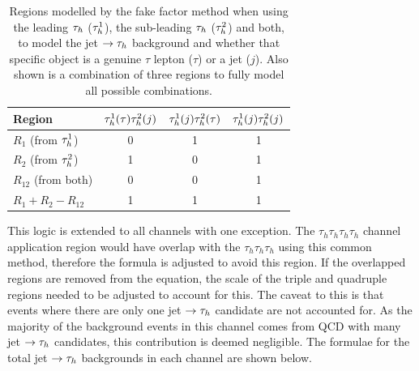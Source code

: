 \begin{table}[H]
\centering
\begin{tabular}{|l|ccc|}
\hline
Region    & $\tau_{h}^1 (\tau) \tau_{h}^2 (j)$ & $\tau_{h}^1 (j) \tau_{h}^2 (\tau)$ & $\tau_{h}^1 (j) \tau_{h}^2 (j)$ \\
\hline
\hline
$R_{1}$ (from $\tau_{h}^1$)     & 0                            & 1                            & 1                         \\
$R_{2}$ (from $\tau_{h}^2$)     & 1                            & 0                            & 1                         \\
$R_{12}$ (from both)         & 0                            & 0                            & 1                         \\
\hline
$R_{1} +R_{2} - R_{12}$      & 1                            & 1                            & 1       \\                  
\hline
\end{tabular}
\caption{Regions modelled by the fake factor method when using the leading $\tau_{h}$ ($\tau_{h}^1$), the sub-leading $\tau_{h}$ ($\tau_{h}^2$) and both, to model the jet $\rightarrow \tau_{h}$ background and whether that specific object is a genuine $\tau$ lepton ($\tau$) or a jet ($j$). Also shown is a combination of three regions to fully model all possible combinations. }
\label{tab:apply_ff}
\end{table}

This logic is extended to all channels with one exception.
The $\tau_h \tau_h \tau_h \tau_h$ channel application region would have overlap with the $\tau_h \tau_h \tau_h$ using this common method, therefore the formula is adjusted to avoid this region.
If the overlapped regions are removed from the equation, the scale of the triple and quadruple regions needed to be adjusted to account for this.
The caveat to this is that events where there are only one jet $\rightarrow \tau_{h}$ candidate are not accounted for.
As the majority of the background events in this channel comes from QCD with many jet $\rightarrow \tau_{h}$ candidates, this contribution is deemed negligible.
The formulae for the total jet $\rightarrow \tau_{h}$ backgrounds in each channel are shown below. \\

